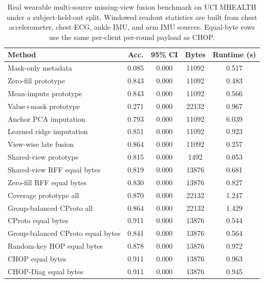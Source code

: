 \begin{table}[t]
\centering
\caption{Real wearable multi-source missing-view fusion benchmark on UCI MHEALTH under a subject-held-out split. Windowed readout statistics are built from chest accelerometer, chest ECG, ankle IMU, and arm IMU sources. Equal-byte rows use the same per-client per-round payload as CHOP.}
\label{tab:if-mhealth-fusion}
\scriptsize
\setlength{\tabcolsep}{3pt}
\renewcommand{\arraystretch}{0.94}
\begin{tabular}{lcccc}
\toprule
Method & Acc. & 95\% CI & Bytes & Runtime (s) \\
\midrule
Mask-only metadata & 0.085 & 0.000 & 11092 & 0.517 \\
Zero-fill prototype & 0.843 & 0.000 & 11092 & 0.483 \\
Mean-impute prototype & 0.843 & 0.000 & 11092 & 0.566 \\
Value+mask prototype & 0.271 & 0.000 & 22132 & 0.967 \\
Anchor PCA imputation & 0.793 & 0.000 & 11092 & 6.039 \\
Learned ridge imputation & 0.851 & 0.000 & 11092 & 0.923 \\
View-wise late fusion & 0.864 & 0.000 & 11092 & 0.257 \\
Shared-view prototype & 0.815 & 0.000 & 1492 & 0.053 \\
Shared-view RFF equal bytes & 0.819 & 0.000 & 13876 & 0.681 \\
Zero-fill RFF equal bytes & 0.830 & 0.000 & 13876 & 0.827 \\
Coverage prototype all & 0.870 & 0.000 & 22132 & 1.247 \\
Group-balanced CProto all & 0.864 & 0.000 & 22132 & 1.429 \\
CProto equal bytes & 0.911 & 0.000 & 13876 & 0.544 \\
Group-balanced CProto equal bytes & 0.841 & 0.000 & 13876 & 0.564 \\
Random-key HOP equal bytes & 0.878 & 0.000 & 13876 & 0.972 \\
CHOP equal bytes & 0.911 & 0.000 & 13876 & 0.963 \\
CHOP-Diag equal bytes & 0.911 & 0.000 & 13876 & 0.945 \\
\bottomrule
\end{tabular}
\end{table}

